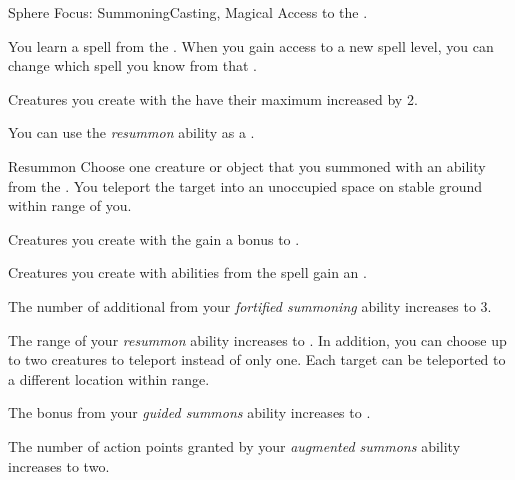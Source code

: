     \begin{feat}{Sphere Focus: Summoning}{Casting, Magical}
        \featpre Access to the  .

         You learn a spell from the  .
        When you gain access to a new spell level, you can change which spell you know from that .

         Creatures you create with the   have their maximum  increased by 2.

         You can use the \textit{resummon} ability as a .
        \begin{freeability}{Resummon}
            Choose one creature or object that you summoned with an ability from the  .
            You teleport the target into an unoccupied space on stable ground within \rngmed range of you.
        \end{freeability}

         Creatures you create with the   gain a  bonus to .

         Creatures you create with abilities from the  spell gain an .

         The number of additional  from your \textit{fortified summoning} ability increases to 3.

         The range of your \textit{resummon} ability increases to \rnglong.
        In addition, you can choose up to two creatures to teleport instead of only one.
        Each target can be teleported to a different location within range.

         The bonus from your \textit{guided summons} ability increases to .

         The number of action points granted by your \textit{augmented summons} ability increases to two.
    \end{feat}

